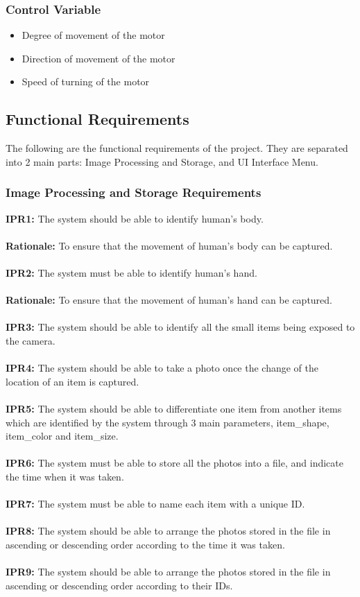 \documentclass[12pt]{article}
\begin{document}
\subsubsection{Control Variable}
\begin{itemize}
    \item Degree of movement of the motor
    \item Direction of movement of the motor
    \item Speed of turning of the motor
\end{itemize}

\subsection{Functional Requirements}
The following are the functional requirements of the project. They are separated into 2 main parts: Image Processing and Storage, and UI Interface Menu.

\subsubsection{Image Processing and Storage Requirements}
\textbf{IPR1:} The system should be able to identify human's body.\\\\
\textbf{Rationale:} To ensure that the movement of human’s body can be captured.\\\\
\textbf{IPR2:} The system must be able to identify human's hand.\\\\
\textbf{Rationale:} To ensure that the movement of human’s hand can be captured.\\\\
\textbf{IPR3:} The system should be able to identify all the small items being exposed to the camera.\\\\
\textbf{IPR4:} The system should be able to take a photo once the change of the location of an item is captured.\\\\
\textbf{IPR5:} The system should be able to differentiate one item from another items which are identified by the system through 3 main parameters, item\_shape, item\_color and item\_size.\\\\
\textbf{IPR6:} The system must be able to store all the photos into a file, and indicate the time when it was taken.\\\\
\textbf{IPR7:} The system must be able to name each item with a unique ID.\\\\
\textbf{IPR8:} The system should be able to arrange the photos stored in the file in ascending or descending order according to the time it was taken.\\\\
\textbf{IPR9:} The system should be able to arrange the photos stored in the file in ascending or descending order according to their IDs.
\end{document}

